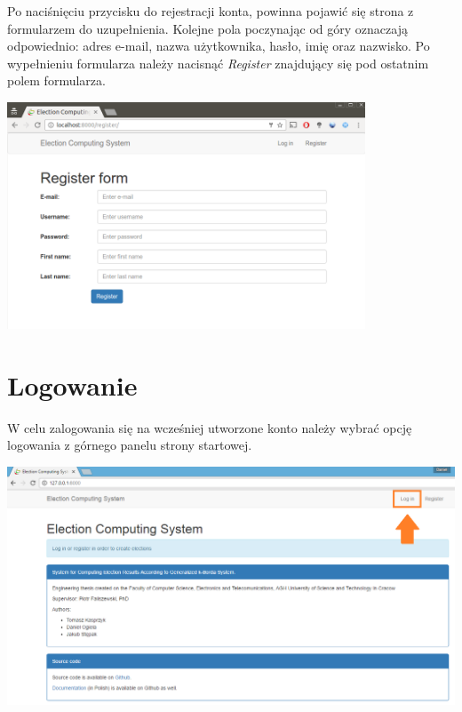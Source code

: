 \documentclass[pdflatex,11pt]{../aghdoc_version2}
\begin{document}
\vspace{\baselineskip}
\vspace{\baselineskip}
Po naciśnięciu przycisku do rejestracji konta, powinna pojawić się strona z formularzem do uzupełnienia. Kolejne pola poczynając od góry oznaczają odpowiednio: adres e-mail, nazwa użytkownika, hasło, imię oraz nazwisko. Po wypełnieniu formularza należy nacisnąć \textit{Register} znajdujący się pod ostatnim polem formularza. 

\begin{center}
\includegraphics[width=0.8\textwidth]{pics/register.png}
\end{center}

\section{Logowanie}
\label{sec:logowanie}

W celu zalogowania się na wcześniej utworzone konto należy wybrać opcję logowania z górnego panelu strony startowej. \\

\begin{center}
\includegraphics[width=1\textwidth]{pics/login_button.png}
\end{center}
\end{document}
